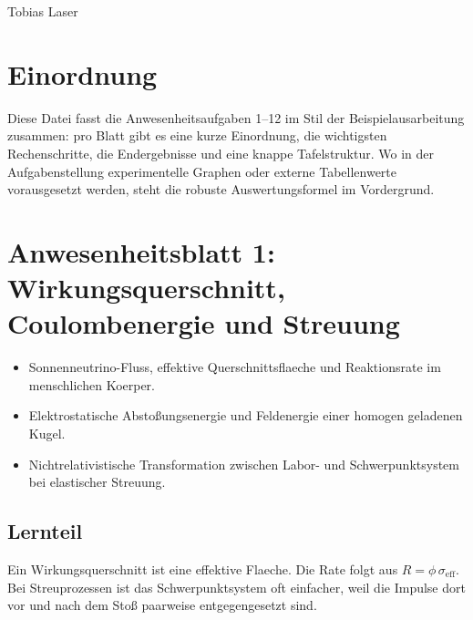 \documentclass[11pt,a4paper]{scrartcl}
\newcommand{\CourseTitle}{Physik IV: Kerne und Teilchen}
\newcommand{\DocumentKind}{Anwesenheitsaufgaben, Tafelvortrag und Lernfassung}
\newcommand{\DocumentTitle}{Anwesenheitsblaetter 1--12}
\newcommand{\DocumentSubtitle}{Proseminar zur Physik IV}
\newcommand{\AuthorName}{Tobias Laser}
\newcommand{\InstitutionName}{Universit\"at Innsbruck}
\newcommand{\SubmissionDate}{\today}
\newcommand{\makeuniversitytitle}{%
\begin{titlepage}\centering\vspace*{2cm}{\Large \CourseTitle\par}\vspace{1.2cm}{\huge\bfseries \DocumentTitle\par}\vspace{0.4cm}{\Large \DocumentSubtitle\par}\vspace{1cm}{\Large \DocumentKind\par}\vfill{\large \AuthorName\par}\vspace{0.2cm}{\large \InstitutionName\par}\vspace{0.8cm}{\large \SubmissionDate\par}\end{titlepage}\pagenumbering{arabic}}
\begin{document}
\makeuniversitytitle
\tableofcontents
\newpage
\section*{Einordnung}
\begin{summarybox}[title={Ziel dieser Datei}]
Diese Datei fasst die Anwesenheitsaufgaben 1--12 im Stil der Beispielausarbeitung zusammen: pro Blatt gibt es eine kurze Einordnung, die wichtigsten Rechenschritte, die Endergebnisse und eine knappe Tafelstruktur. Wo in der Aufgabenstellung experimentelle Graphen oder externe Tabellenwerte vorausgesetzt werden, steht die robuste Auswertungsformel im Vordergrund.
\end{summarybox}

\section{Anwesenheitsblatt 1: Wirkungsquerschnitt, Coulombenergie und Streuung}
\begin{taskbox}[title=Aufgaben]\begin{itemize}
\item Sonnenneutrino-Fluss, effektive Querschnittsflaeche und Reaktionsrate im menschlichen Koerper.
\item Elektrostatische Abstoßungsenergie und Feldenergie einer homogen geladenen Kugel.
\item Nichtrelativistische Transformation zwischen Labor- und Schwerpunktsystem bei elastischer Streuung.
\end{itemize}\end{taskbox}
\subsection{Lernteil}
\begin{learningbox}
Ein Wirkungsquerschnitt ist eine effektive Flaeche. Die Rate folgt aus \(R=\phi\,\sigma_{\mathrm{eff}}\). Bei Streuprozessen ist das Schwerpunktsystem oft einfacher, weil die Impulse dort vor und nach dem Stoß paarweise entgegengesetzt sind.
\end{learningbox}
\end{document}
